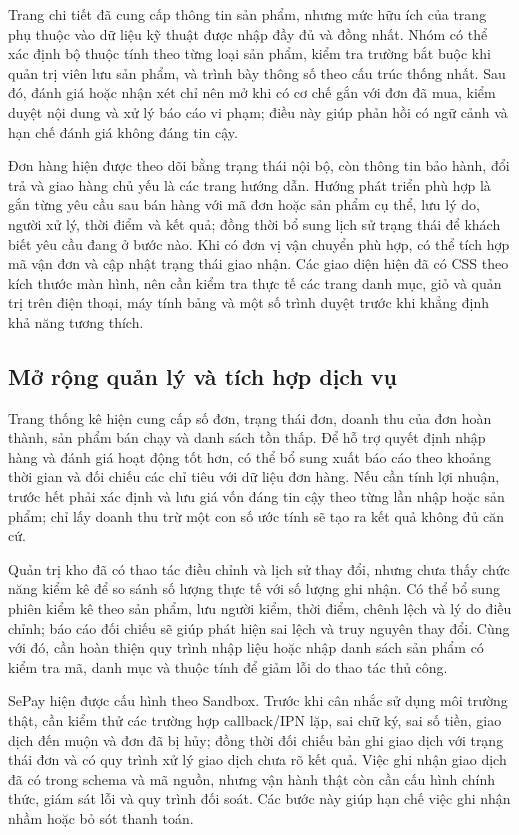 Trang chi tiết đã cung cấp thông tin sản phẩm, nhưng mức hữu ích của trang phụ thuộc vào dữ liệu kỹ thuật được nhập đầy đủ và đồng nhất. Nhóm có thể xác định bộ thuộc tính theo từng loại sản phẩm, kiểm tra trường bắt buộc khi quản trị viên lưu sản phẩm, và trình bày thông số theo cấu trúc thống nhất. Sau đó, đánh giá hoặc nhận xét chỉ nên mở khi có cơ chế gắn với đơn đã mua, kiểm duyệt nội dung và xử lý báo cáo vi phạm; điều này giúp phản hồi có ngữ cảnh và hạn chế đánh giá không đáng tin cậy.

Đơn hàng hiện được theo dõi bằng trạng thái nội bộ, còn thông tin bảo hành, đổi trả và giao hàng chủ yếu là các trang hướng dẫn. Hướng phát triển phù hợp là gắn từng yêu cầu sau bán hàng với mã đơn hoặc sản phẩm cụ thể, lưu lý do, người xử lý, thời điểm và kết quả; đồng thời bổ sung lịch sử trạng thái để khách biết yêu cầu đang ở bước nào. Khi có đơn vị vận chuyển phù hợp, có thể tích hợp mã vận đơn và cập nhật trạng thái giao nhận. Các giao diện hiện đã có CSS theo kích thước màn hình, nên cần kiểm tra thực tế các trang danh mục, giỏ và quản trị trên điện thoại, máy tính bảng và một số trình duyệt trước khi khẳng định khả năng tương thích.

\subsection{Mở rộng quản lý và tích hợp dịch vụ}

Trang thống kê hiện cung cấp số đơn, trạng thái đơn, doanh thu của đơn hoàn thành, sản phẩm bán chạy và danh sách tồn thấp. Để hỗ trợ quyết định nhập hàng và đánh giá hoạt động tốt hơn, có thể bổ sung xuất báo cáo theo khoảng thời gian và đối chiếu các chỉ tiêu với dữ liệu đơn hàng. Nếu cần tính lợi nhuận, trước hết phải xác định và lưu giá vốn đáng tin cậy theo từng lần nhập hoặc sản phẩm; chỉ lấy doanh thu trừ một con số ước tính sẽ tạo ra kết quả không đủ căn cứ.

Quản trị kho đã có thao tác điều chỉnh và lịch sử thay đổi, nhưng chưa thấy chức năng kiểm kê để so sánh số lượng thực tế với số lượng ghi nhận. Có thể bổ sung phiên kiểm kê theo sản phẩm, lưu người kiểm, thời điểm, chênh lệch và lý do điều chỉnh; báo cáo đối chiếu sẽ giúp phát hiện sai lệch và truy nguyên thay đổi. Cùng với đó, cần hoàn thiện quy trình nhập liệu hoặc nhập danh sách sản phẩm có kiểm tra mã, danh mục và thuộc tính để giảm lỗi do thao tác thủ công.

SePay hiện được cấu hình theo Sandbox. Trước khi cân nhắc sử dụng môi trường thật, cần kiểm thử các trường hợp callback/IPN lặp, sai chữ ký, sai số tiền, giao dịch đến muộn và đơn đã bị hủy; đồng thời đối chiếu bản ghi giao dịch với trạng thái đơn và có quy trình xử lý giao dịch chưa rõ kết quả. Việc ghi nhận giao dịch đã có trong schema và mã nguồn, nhưng vận hành thật còn cần cấu hình chính thức, giám sát lỗi và quy trình đối soát. Các bước này giúp hạn chế việc ghi nhận nhầm hoặc bỏ sót thanh toán.


